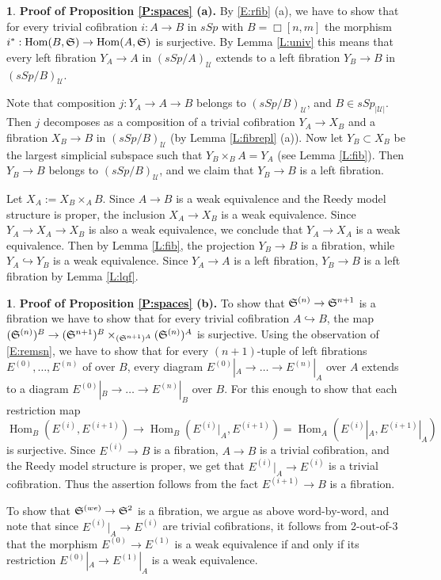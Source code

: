 \documentclass[12pt]{amsart}
\theoremstyle{plain}
\theoremstyle{definition}
\newtheorem{Emp}[Thm]{}
\numberwithin{equation}{section}
\newcommand{\cal}[1]{\mathcal{#1}}
\newcommand{\C}[1]{\cal#1}
\newcommand{\hra}{\hookrightarrow}
\newcommand{\rl}[1]{Lemma \ref{L:#1}}
\newcommand{\rp}[1]{Proposition \ref{P:#1}}
\newcommand{\re}[1]{\ref{E:#1}}
\newcommand{\Hom}{\operatorname{Hom}}
\renewcommand{\S}{\frak{S}}
\begin{document}
\begin{Emp} \label{E:pfspacesa}
{\bf Proof of \rp{spaces} (a).} By \re{rfib} (a), we have to show
that for every trivial cofibration $i:A\to B$ in $sSp$ with
$B=\Box[n,m]$ the morphism $i^*:\Hom(B,\S)\to\Hom(A,\S)$
is surjective. By \rl{univ} this means that every left fibration
$Y_A\to A$ in $(sSp/A)_{\C{U}}$ extends to a left fibration
$Y_B\to B$ in $(sSp/B)_{\C{U}}$.

Note that composition $j:Y_A\to A\to B$ belongs to
$(sSp/B)_{\C{U}}$, and $B\in sSp_{|\C{U}|}$. Then $j$
decomposes as a composition of a trivial cofibration $Y_A\to X_B$
and a fibration $X_B\to B$ in $(sSp/B)_{\C{U}}$ (by \rl{fibrepl} (a)).
Now let $Y_B\subset X_B$ be the largest simplicial subspace such
that $Y_B\times_B A=Y_A$ (see \rl{fib}). Then $Y_B\to B$ belongs
to $(sSp/B)_{\C{U}}$, and we claim that $Y_B\to B$ is a left
fibration.

Let $X_A:=X_B\times_A B$. Since $A\to B$ is a weak equivalence and
the Reedy model structure is proper, the inclusion $X_A\to X_B$ is
a weak equivalence. Since $Y_A\to X_A\to X_B$ is also a weak
equivalence, we conclude that $Y_A\to X_A$ is a weak equivalence.
Then by \rl{fib}, the projection $Y_B\to B$ is a fibration, while
$Y_A\hra Y_B$ is a weak equivalence. Since $Y_A\to A$ is a left
fibration, $Y_B\to B$ is a left fibration by \rl{lqf}.
\end{Emp}


\begin{Emp} \label{E:pfspacesb}
{\bf Proof of \rp{spaces} (b).}
To show that $\S^{(n)}\to \S^{n+1}$ is a fibration we have to
show that for every trivial cofibration $A\hra B$, the map
$(\S^{(n)})^B\to (\S^{n+1})^B\times_{(\S^{n+1})^A}(\S^{(n)})^A$ is
surjective. Using the observation of \re{remsn},  we have to show
that for every $(n+1)$-tuple of left fibrations
$E^{(0)},\ldots,E^{(n)}$ of over $B$, every diagram
$E^{(0)}|_A\to\ldots\to E^{(n)}|_A$ over $A$ extends to a diagram
$E^{(0)}|_B\to\ldots\to E^{(n)}|_B$ over $B$. For this enough to
show that each restriction map
\[
\Hom_B(E^{(i)},E^{(i+1)})\to
\Hom_B(E^{(i)}|_A,E^{(i+1)})=\Hom_A(E^{(i)}|_A,E^{(i+1)}|_A)
\]
is surjective. Since $E^{(i)}\to B$ is a fibration, $A\to B$ is a
trivial cofibration, and the Reedy model structure is proper, we
get that $E^{(i)}|_A\to E^{(i)}$ is a trivial cofibration. Thus
the assertion follows from the fact $E^{(i+1)}\to B$ is a
fibration.

To show that $\S^{(we)}\to \S^2$ is a fibration, we argue as above
word-by-word, and note that since $E^{(i)}|_A\to E^{(i)}$ are
trivial cofibrations, it follows from 2-out-of-3 that the morphism
$E^{(0)}\to E^{(1)}$ is a weak equivalence if and only if its
restriction $E^{(0)}|_A\to E^{(1)}|_A$ is a weak equivalence.
\end{Emp}
\end{document}

